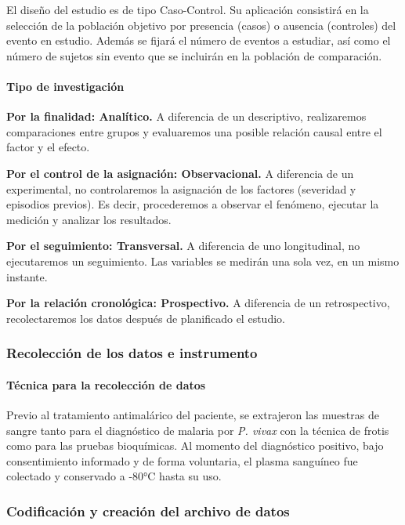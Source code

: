 \documentclass[a4paper]{article}
\let\oldparagraph\paragraph
\renewcommand{\paragraph}[1]{\oldparagraph{#1}\mbox{}}
\begin{document}
El diseño del estudio es de tipo Caso-Control. Su aplicación consistirá
en la selección de la población objetivo por presencia (casos) o
ausencia (controles) del evento en estudio. Además se fijará el número
de eventos a estudiar, así como el número de sujetos sin evento que se
incluirán en la población de comparación.

\paragraph{Tipo de investigación}\label{tipo-de-investigacion}

\textbf{Por la finalidad: Analítico.} A diferencia de un descriptivo,
realizaremos comparaciones entre grupos y evaluaremos una posible
relación causal entre el factor y el efecto.

\textbf{Por el control de la asignación: Observacional.} A diferencia de
un experimental, no controlaremos la asignación de los factores
(severidad y episodios previos). Es decir, procederemos a observar el
fenómeno, ejecutar la medición y analizar los resultados.

\textbf{Por el seguimiento: Transversal.} A diferencia de uno
longitudinal, no ejecutaremos un seguimiento. Las variables se medirán
una sola vez, en un mismo instante.

\textbf{Por la relación cronológica: Prospectivo.} A diferencia de un
retrospectivo, recolectaremos los datos después de planificado el
estudio.

\subsubsection{Recolección de los datos e
instrumento}\label{recoleccion-de-los-datos-e-instrumento}

\paragraph{Técnica para la recolección de
datos}\label{tecnica-para-la-recoleccion-de-datos}

Previo al tratamiento antimalárico del paciente, se extrajeron las
muestras de sangre tanto para el diagnóstico de malaria por \emph{P.
vivax} con la técnica de frotis como para las pruebas bioquímicas. Al
momento del diagnóstico positivo, bajo consentimiento informado y de
forma voluntaria, el plasma sanguíneo fue colectado y conservado a -80°C
hasta su uso.

\subsubsection{Codificación y creación del archivo de
datos}\label{codificacion-y-creacion-del-archivo-de-datos}
\end{document}

